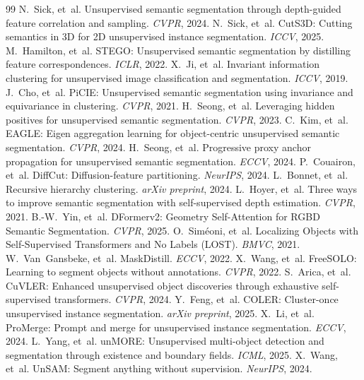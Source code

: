 \documentclass[10pt,twocolumn,letterpaper]{article}
\begin{document}
\begin{thebibliography}{99}
 N.~Sick, et~al. Unsupervised semantic segmentation through depth-guided feature correlation and sampling. \emph{CVPR}, 2024.
 N.~Sick, et~al. CutS3D: Cutting semantics in 3D for 2D unsupervised instance segmentation. \emph{ICCV}, 2025.
 M.~Hamilton, et~al. STEGO: Unsupervised semantic segmentation by distilling feature correspondences. \emph{ICLR}, 2022.
 X.~Ji, et~al. Invariant information clustering for unsupervised image classification and segmentation. \emph{ICCV}, 2019.
 J.~Cho, et~al. PiCIE: Unsupervised semantic segmentation using invariance and equivariance in clustering. \emph{CVPR}, 2021.
 H.~Seong, et~al. Leveraging hidden positives for unsupervised semantic segmentation. \emph{CVPR}, 2023.
 C.~Kim, et~al. EAGLE: Eigen aggregation learning for object-centric unsupervised semantic segmentation. \emph{CVPR}, 2024.
 H.~Seong, et~al. Progressive proxy anchor propagation for unsupervised semantic segmentation. \emph{ECCV}, 2024.
 P.~Couairon, et~al. DiffCut: Diffusion-feature partitioning. \emph{NeurIPS}, 2024.
 L.~Bonnet, et~al. Recursive hierarchy clustering. \emph{arXiv preprint}, 2024.
 L.~Hoyer, et~al. Three ways to improve semantic segmentation with self-supervised depth estimation. \emph{CVPR}, 2021.
 B.-W.~Yin, et~al. DFormerv2: Geometry Self-Attention for RGBD Semantic Segmentation. \emph{CVPR}, 2025.
 O.~Sim\'eoni, et~al. Localizing Objects with Self-Supervised Transformers and No Labels (LOST). \emph{BMVC}, 2021.
 W.~Van~Gansbeke, et~al. MaskDistill. \emph{ECCV}, 2022.
 X.~Wang, et~al. FreeSOLO: Learning to segment objects without annotations. \emph{CVPR}, 2022.
 S.~Arica, et~al. CuVLER: Enhanced unsupervised object discoveries through exhaustive self-supervised transformers. \emph{CVPR}, 2024.
 Y.~Feng, et~al. COLER: Cluster-once unsupervised instance segmentation. \emph{arXiv preprint}, 2025.
 X.~Li, et~al. ProMerge: Prompt and merge for unsupervised instance segmentation. \emph{ECCV}, 2024.
 L.~Yang, et~al. unMORE: Unsupervised multi-object detection and segmentation through existence and boundary fields. \emph{ICML}, 2025.
 X.~Wang, et~al. UnSAM: Segment anything without supervision. \emph{NeurIPS}, 2024.

\end{thebibliography}
\end{document}
